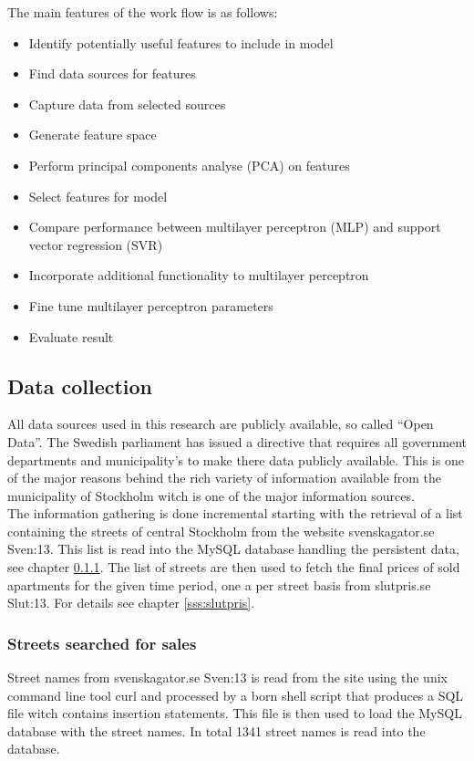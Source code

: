 The main features of the work flow is as follows: 
\begin{itemize}
\item Identify potentially useful features to include in model
\item Find data sources for features
\item Capture data from selected sources
\item Generate feature space
\item Perform principal components analyse (PCA) on features 
\item Select features for model
\item Compare performance between multilayer perceptron (MLP) and support vector regression (SVR)
\item Incorporate additional functionality to multilayer perceptron
\item Fine tune multilayer perceptron parameters
\item Evaluate result
\end{itemize}

\subsection{Data collection}
All data sources used in this research are publicly available, so called ``Open Data''. The Swedish parliament has issued a directive that requires all government departments and municipality's to make there data publicly available. This is one of the major reasons behind the rich variety of information available from the municipality of Stockholm witch is one of the major information sources.  
\\
The information gathering is done incremental starting with the retrieval of a list containing the streets of central Stockholm from the website svenskagator.se \cite{dat}{Sven:13}. This list is read into the MySQL database handling the persistent data, see chapter \ref{sss:street_load}. The list of streets are then used to fetch the final prices of sold apartments for the given time period, one a per street basis from slutpris.se \cite{dat}{Slut:13}. For details see chapter \ref{sss:slutpris}.

\subsubsection{Streets searched for sales} \label{sss:street_load}
Street names from svenskagator.se \cite{dat}{Sven:13} is read from the site using the unix command line tool curl and processed by a born shell script that produces a SQL file witch contains insertion statements. This file is then used to load the MySQL database with the street names. In total 1341 street names is read into the database.
\\

